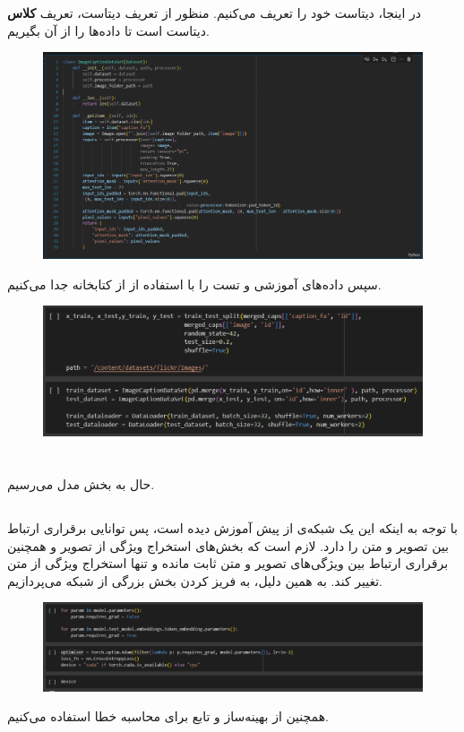 \documentclass[12pt]{article}
\begin{document}
	\section{}
	در اینجا، دیتاست خود را تعریف می‌کنیم. منظور از تعریف دیتاست، تعریف \textbf{کلاس}  دیتاست است تا داده‌ها را از آن بگیریم.
	\begin{figure}[H]
		\centering
		\includegraphics[width=0.9\linewidth]{pic_9}
	\end{figure}
	سپس داده‌های آموزشی و تست را با استفاده از  از کتابخانه  جدا می‌کنیم.
	\begin{figure}[H]
		\centering
		\includegraphics[width=0.9\linewidth]{pic_10}
	\end{figure}
	\section{}
	حال به بخش  مدل می‌رسیم.
	\subsection{}
	با توجه به اینکه این یک شبکه‌ی از پیش آموزش دیده است، پس توانایی برقراری ارتباط بین تصویر و متن را دارد. لازم است که بخش‌های استخراج ویژگی از تصویر و همچنین برقراری ارتباط بین ویژگی‌های تصویر و متن ثابت مانده و تنها استخراج ویژگی از متن تغییر کند. به همین دلیل، به فریز کردن بخش بزرگی از شبکه می‌پردازیم.
	\begin{figure}[H]
		\centering
		\includegraphics[width=0.9\linewidth]{pic_11}
	\end{figure}
	همچنین از بهینه‌ساز  و تابع  برای محاسبه خطا استفاده می‌کنیم.
	
\end{document}
